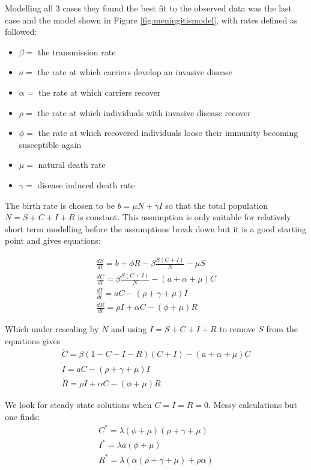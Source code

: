 \documentclass[11pt]{article} %
\begin{document}
 Modelling all 3 cases they found the best fit to the observed data was the last case and the model shown in Figure \ref{fig:meningitismodel}, with rates defined as followed:
\begin{itemize}
	\item $ \beta =$ the transmission rate
	\item $ a= $ the rate at which carriers develop an invasive disease
	\item $ \alpha =$ the rate at which carriers recover 
	\item $ \rho= $ the rate at which individuals with invasive disease recover
	\item $ \phi = $ the rate at which recovered individuals loose their immunity becoming susceptible again 
	\item $ \mu = $ natural death rate
	\item $ \gamma = $ disease induced death rate

\end{itemize}

The birth rate is chosen to be $ b=\mu N +\gamma I  $ so that the total population $ N=S+C+I+R $ is constant. This assumption is only suitable for relatively short term modelling before the assumptions break down but it is a good starting point and gives equations: 

\begin{eqnarray}
	\frac{dS}{dt}= b +\phi R-\beta \frac{S(C+I)}{N}-\mu S\\
	\frac{dC}{dt}=\beta \frac{S(C+I)}{N}-(a+\alpha+\mu)C\\
	\frac{dI}{dt}=aC-(\rho +\gamma+\mu)I\\
	\frac{dR}{dt}=\rho I +\alpha C-(\phi+\mu)R
\end{eqnarray}
	
	Which under rescaling by $ N $ and using  $ I=S+C+I+R $ to remove $ S $ from the equations gives
	\begin{eqnarray}
	\dot{C}=\beta(1-C-I-R)(C+I)-(a+\alpha+\mu)C\\
	\dot{I}=aC-(\rho+\gamma+\mu)I\\
	\dot{R}=\rho I+\alpha C-(\phi+\mu)R
	\end{eqnarray}
	
	We look for steady state solutions when $ \dot{C}=\dot{I}=\dot{R}=0 $. Messy calculations but one finds:
	\begin{eqnarray}
	C^*=\lambda (\phi+\mu)(\rho+\gamma+\mu)\\
	I^*=\lambda a(\phi+\mu)\\
	R^*=\lambda(\alpha(\rho+\gamma+\mu)+\rho\alpha)
	\end{eqnarray}
	
\end{document}
